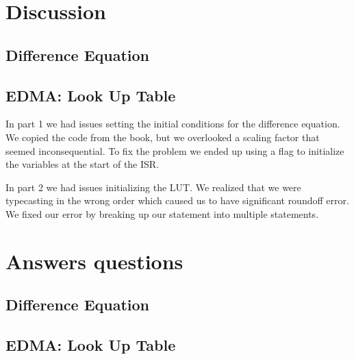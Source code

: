 \documentclass{article}
\begin{document}

\section{Discussion}

\subsection{Difference Equation}
\subsection{EDMA: Look Up Table}

In part 1 we had issues setting the initial conditions for the difference equation.
We copied the code from the book, but we overlooked a scaling factor that seemed inconsequential.
To fix the problem we ended up using a flag to initialize the variables at the start of the ISR.

In part 2 we had issues initializing the LUT.
We realized that we were typecasting in the wrong order which caused us to have significant roundoff error.
We fixed our error by breaking up our statement into multiple statements.


\section{Answers questions}

\subsection{Difference Equation}
\subsection{EDMA: Look Up Table}
\end{document}
